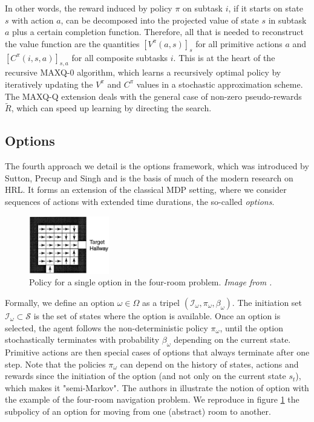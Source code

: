 \documentclass{article}
\begin{document}
In other words, the reward induced by policy $\pi$ on subtask $i$, if it starts on state $s$ with action $a$, can be decomposed into the projected value of state $s$ in subtask $a$ plus a certain completion function.
Therefore, all that is needed to reconstruct the value function are the quantities $[V^{\pi}(a, s)]_s$ for all primitive actions $a$ and $[C^{\pi}(i, s, a)]_{s, a}$ for all composite subtasks $i$. This is at the heart of the recursive MAXQ-0 algorithm, which learns a recursively optimal policy by iteratively updating the $V^{\pi}$ and $C^{\pi}$ values in a stochastic approximation scheme. The MAXQ-Q extension deals with the general case of non-zero pseudo-rewards $\tilde{R}$, which can speed up learning by directing the search.

\subsection{Options}

The fourth approach we detail is the options framework, which was introduced by Sutton, Precup and Singh \cite{sutton_between_1999} and is the basis of much of the modern research on HRL. It forms an extension of the classical MDP setting, where we consider sequences of actions with extended time durations, the so-called \textit{options}.

\begin{figure}
    \centering
    \includegraphics[width=3.5cm]{images/single_option.png}
    \caption{Policy for a single option in the four-room problem. \small \it Image from \cite{sutton_between_1999}.}
    \label{fig:single-option}
    \vspace{-0.5cm}
\end{figure}

Formally, we define an option $\omega \in \Omega$ as a tripel $(\mathcal{I}_\omega, \pi_\omega, \beta_\omega)$. The initiation set $\mathcal{I}_\omega \subset \mathcal{S}$ is the set of states where the option is available. Once an option is selected, the agent follows the non-deterministic policy $\pi_\omega$, until the option stochastically terminates with probability $\beta_\omega$ depending on the current state. Primitive actions are then special cases of options that always terminate after one step. Note that the policies $\pi_\omega$ can  depend on the history of states, actions and rewards since the initiation of the option (and not only on the current state $s_t$), which makes it "semi-Markov". The authors in \cite{sutton_between_1999} illustrate the notion of option with the example of the four-room navigation problem. We reproduce in figure \ref{fig:single-option} the subpolicy of an option for moving from one (abstract) room to another.
\end{document}
